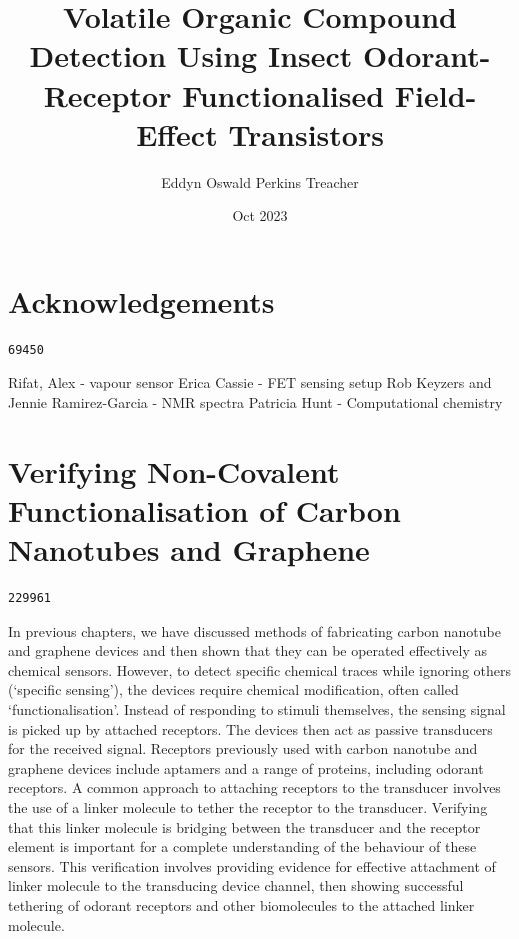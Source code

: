 \documentclass[
  a4paper,
]{scrbook}
\title{Volatile Organic Compound Detection Using Insect Odorant-Receptor
Functionalised Field-Effect Transistors}
\author{Eddyn Oswald Perkins Treacher}
\date{Oct 2023}
\begin{document}
\frontmatter
\maketitle
\ifdefined\Shaded\renewenvironment{Shaded}{\begin{tcolorbox}[enhanced, interior hidden, sharp corners, frame hidden, borderline west={3pt}{0pt}{shadecolor}, boxrule=0pt, breakable]}{\end{tcolorbox}}\fi

\mainmatter
{}

\hypertarget{acknowledgements}{%
\chapter*{Acknowledgements}\label{acknowledgements}}


\begin{verbatim}
69450
\end{verbatim}

Rifat, Alex - vapour sensor Erica Cassie - FET sensing setup Rob Keyzers
and Jennie Ramirez-Garcia - NMR spectra Patricia Hunt - Computational
chemistry


\hypertarget{verifying-non-covalent-functionalisation-of-carbon-nanotubes-and-graphene}{%
\chapter{Verifying Non-Covalent Functionalisation of Carbon Nanotubes
and
Graphene}\label{verifying-non-covalent-functionalisation-of-carbon-nanotubes-and-graphene}}

\begin{verbatim}
229961
\end{verbatim}

In previous chapters, we have discussed methods of fabricating carbon
nanotube and graphene devices and then shown that they can be operated
effectively as chemical sensors. However, to detect specific chemical
traces while ignoring others (`specific sensing'), the devices require
chemical modification, often called `functionalisation'. Instead of
responding to stimuli themselves, the sensing signal is picked up by
attached receptors. The devices then act as passive transducers for the
received signal. Receptors previously used with carbon nanotube and
graphene devices include aptamers and a range of proteins, including
odorant receptors. A common approach to attaching receptors to the
transducer involves the use of a linker molecule to tether the receptor
to the transducer. Verifying that this linker molecule is bridging
between the transducer and the receptor element is important for a
complete understanding of the behaviour of these sensors. This
verification involves providing evidence for effective attachment of
linker molecule to the transducing device channel, then showing
successful tethering of odorant receptors and other biomolecules to the
attached linker molecule.
\end{document}
